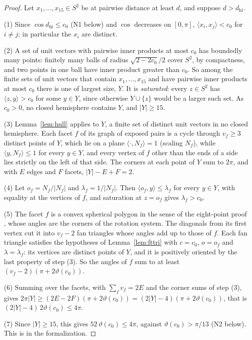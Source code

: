 \documentclass[12pt]{amsart}
\theoremstyle{definition}
\theoremstyle{plain}
\theoremstyle{definition}
\newcommand{\Sph}{S^2}
\newcommand{\dhi}{d_{\mathrm{hi}}}
\begin{document}
\begin{proof}
Let $x_1,\dots,x_{15}\in\Sph$ be at pairwise distance at least $d$, and suppose $d>\dhi$.

(1) Since $\cos\dhi\le c_0$ (N1 below) and $\cos$ decreases on $[0,\pi]$, $\langle x_i,x_j\rangle<c_0$ for $i\ne j$; in particular the $x_i$ are distinct.

(2) A set of unit vectors with pairwise inner products at most $c_0$ has boundedly many points: finitely many balls of radius $\sqrt{2-2c_0}/2$ cover $\Sph$, by compactness, and two points in one ball have inner product greater than $c_0$. So among the finite sets of unit vectors that contain $x_1,\dots,x_{15}$ and have pairwise inner products at most $c_0$ there is one of largest size, $Y$. It is \emph{saturated}: every $z\in\Sph$ has $\langle z,y\rangle>c_0$ for some $y\in Y$, since otherwise $Y\cup\{z\}$ would be a larger such set. As $c_0>0$, no closed hemisphere contains $Y$, and $|Y|\ge15$.

(3) Lemma~\ref{lem:hull} applies to $Y$, a finite set of distinct unit vectors in no closed hemisphere. Each facet $f$ of its graph of exposed pairs is a cycle through $v_f\ge3$ distinct points of $Y$, which lie on a plane $\langle\cdot,N_f\rangle=1$ (scaling $N_f$), while $\langle y,N_f\rangle\le1$ for every $y\in Y$, and every vertex of $f$ other than the ends of a side lies strictly on the left of that side. The corners at each point of $Y$ sum to $2\pi$, and with $E$ edges and $F$ facets, $|Y|-E+F=2$.

(4) Let $o_f=N_f/|N_f|$ and $\lambda_f=1/|N_f|$. Then $\langle o_f,y\rangle\le\lambda_f$ for every $y\in Y$, with equality at the vertices of $f$, and saturation at $z=o_f$ gives $\lambda_f>c_0$.

(5) The facet $f$ is a convex spherical polygon in the sense of the eight-point proof \cite{KLT}, whose angles are the corners of the rotation system. The diagonals from its first vertex cut it into $v_f-2$ fan triangles whose angles add up to those of $f$. Each fan triangle satisfies the hypotheses of Lemma~\ref{lem:fttri} with $c=c_0$, $o=o_f$ and $\lambda=\lambda_f$: its vertices are distinct points of $Y$, and it is positively oriented by the last property of step (3). So the angles of $f$ sum to at least $(v_f-2)(\pi+2\vartheta(c_0))$.

(6) Summing over the facets, with $\sum_fv_f=2E$ and the corner sums of step (3), gives $2\pi|Y|\ge(2E-2F)(\pi+2\vartheta(c_0))=(2|Y|-4)(\pi+2\vartheta(c_0))$, that is $(2|Y|-4)\,2\vartheta(c_0)\le4\pi$.

(7) Since $|Y|\ge15$, this gives $52\,\vartheta(c_0)\le4\pi$, against $\vartheta(c_0)>\pi/13$ (N2 below). This is  in the formalization.
\end{proof}
\end{document}
